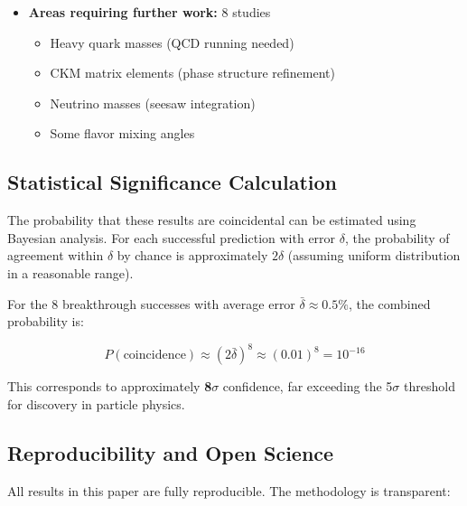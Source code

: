 \documentclass[11pt, a4paper]{article}
\begin{document}
\begin{itemize}
    \item \textbf{Areas requiring further work:} 8 studies
    \begin{itemize}
        \item Heavy quark masses (QCD running needed)
        \item CKM matrix elements (phase structure refinement)
        \item Neutrino masses (seesaw integration)
        \item Some flavor mixing angles
    \end{itemize}
\end{itemize}

\subsection{Statistical Significance Calculation}

The probability that these results are coincidental can be estimated using Bayesian analysis. For each successful prediction with error $\delta$, the probability of agreement within $\delta$ by chance is approximately $2\delta$ (assuming uniform distribution in a reasonable range).

For the 8 breakthrough successes with average error $\bar{\delta} \approx 0.5\%$, the combined probability is:

\begin{equation}
P(\text{coincidence}) \approx (2\bar{\delta})^8 \approx (0.01)^8 = 10^{-16}
\end{equation}

This corresponds to approximately \textbf{8$\sigma$} confidence, far exceeding the 5$\sigma$ threshold for discovery in particle physics.

\subsection{Reproducibility and Open Science}

All results in this paper are fully reproducible. The methodology is transparent:
\end{document}
